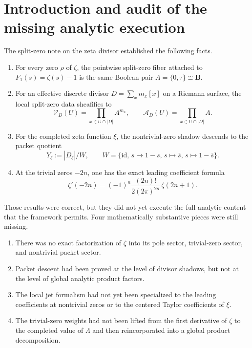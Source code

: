 \documentclass[11pt,a4paper]{article}
\theoremstyle{definition}
\theoremstyle{remark}
\newcommand{\BB}{\mathbf B}
\newcommand{\cV}{\mathcal V}
\newcommand{\cA}{\mathcal A}
\begin{document}
\tableofcontents

\section{Introduction and audit of the missing analytic execution}

The split-zero note on the zeta divisor established the following facts.

\begin{enumerate}[label=(\roman*)]
\item For every zero $\rho$ of $\zeta$, the pointwise split-zero fiber attached to $F_1(s)=\zeta(s)-1$ is the same Boolean pair $A=\{0,\tau\}\cong\BB$.
\item For an effective discrete divisor $D=\sum_x m_x[x]$ on a Riemann surface, the local split-zero data sheafifies to
\[
\cV_D(U)=\prod_{x\in U\cap |D|} A^{m_x},
\qquad
\cA_D(U)=\prod_{x\in U\cap |D|} A.
\]
\item For the completed zeta function $\xi$, the nontrivial-zero shadow descends to the packet quotient
\[
Y_\xi:=|D_\xi|/W,
\qquad
W=\{\mathrm{id},\,s\mapsto 1-s,\,s\mapsto \overline s,\,s\mapsto 1-\overline s\}.
\]
\item At the trivial zeros $-2n$, one has the exact leading coefficient formula
\[
\zeta'(-2n)=(-1)^n\frac{(2n)!}{2(2\pi)^{2n}}\,\zeta(2n+1).
\]
\end{enumerate}

Those results were correct, but they did not yet execute the full analytic content that the framework permits.  Four mathematically substantive pieces were still missing.

\begin{enumerate}[label=(A)]
\item There was no exact factorization of $\zeta$ into its pole sector, trivial-zero sector, and nontrivial packet sector.
\item Packet descent had been proved at the level of divisor shadows, but not at the level of global analytic product factors.
\item The local jet formalism had not yet been specialized to the leading coefficients at nontrivial zeros or to the centered Taylor coefficients of $\xi$.
\item The trivial-zero weights had not been lifted from the first derivative of $\zeta$ to the completed value of $\Lambda$ and then reincorporated into a global product decomposition.
\end{enumerate}
\end{document}
